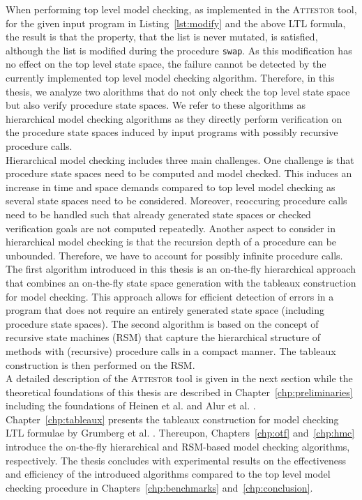 \documentclass[a4paper, 12pt, twoside]{report}
\begin{document}
	When performing top level model checking, as implemented in the \textsc{Attestor} tool, for the given input program in Listing~\ref{lst:modify} and the above LTL formula, the result is that the property, that the list is never mutated, is satisfied, although the list is modified during the procedure \texttt{swap}. As this modification has no effect on the top level state space, the failure cannot be detected by the currently implemented top level model checking algorithm. Therefore, in this thesis, we analyze two alorithms that do not only check the top level state space but also verify procedure state spaces. We refer to these algorithms as hierarchical model checking algorithms as they directly perform verification on the procedure state spaces induced by input programs with possibly recursive procedure calls. \\
	
	Hierarchical model checking includes three main challenges. One challenge is that procedure state spaces need to be computed and model checked. This induces an increase in time and space demands compared to top level model checking as several state spaces need to be considered. Moreover, reoccuring procedure calls need to be handled such that already generated state spaces or checked verification goals are not computed repeatedly. Another aspect to consider in hierarchical model checking is that the recursion depth of a procedure can be unbounded. Therefore, we have to account for possibly infinite procedure calls.\\
	
	The first algorithm introduced in this thesis is an on-the-fly hierarchical approach that combines an on-the-fly state space generation with the tableaux construction for model checking. This approach allows for efficient detection of errors in a program that does not require an entirely generated state space (including procedure state spaces). The second algorithm is based on the concept of recursive state machines (RSM) that capture the hierarchical structure of methods with (recursive) procedure calls in a compact manner. The tableaux construction is then performed on the RSM.\\	
	
	A detailed description of the \textsc{Attestor} tool is given in the next section while the theoretical foundations of this thesis are described in Chapter~\ref{chp:preliminaries} including the foundations of Heinen et al. \cite{heinen2015juggrnaut} and Alur et al. \cite{alur2001analysis}. Chapter~\ref{chp:tableaux} presents the tableaux construction for model checking LTL formulae by Grumberg et al. \cite{bhat1995efficient}. Thereupon, Chapters~\ref{chp:otf} and~\ref{chp:hmc} introduce the on-the-fly hierarchical and RSM-based model checking algorithms, respectively. The thesis concludes with experimental results on the effectiveness and efficiency of the introduced algorithms compared to the top level model checking procedure in Chapters~\ref{chp:benchmarks} and~\ref{chp:conclusion}. 
	
\end{document}
